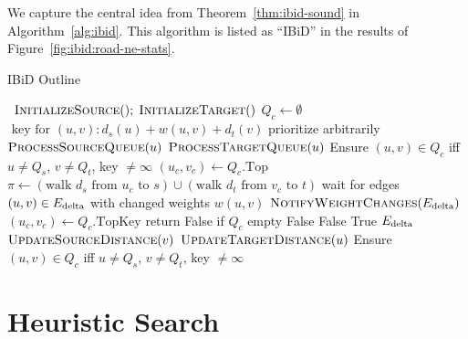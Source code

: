 We capture the central idea from Theorem~\ref{thm:ibid-sound}
in Algorithm~\ref{alg:ibid}.
This algorithm is listed as ``IBiD''
in the results of Figure~\ref{fig:ibid:road-ne-stats}.

\begin{algorithm}[t]
   \caption{IBiD Outline}
   \label{alg:ibid}
   \begin{algorithmic}[1]
       {\,}
         \State $\mbox{\sc InitializeSource}(); \; \mbox{\sc InitializeTarget}()$
         \State $Q_c \gets \emptyset$
            \Comment $\mbox{ key for } (u,v): d_s(u) + w(u,v) + d_t(v)$
         \Loop
                     \Comment prioritize arbitrarily
                  \State $\mbox{\sc ProcessSourceQueue}(u)$
               \Else
                  \State $\mbox{\sc ProcessTargetQueue}(u)$
               \EndIf
               \State Ensure $(u,v) \in Q_c$ iff
                  $u \neq Q_s$, $v \neq Q_t$, key $\neq \infty$
            \EndWhile
            \State $(u_c,v_c) \gets Q_c.\mbox{Top}$
            \State $\pi \gets
               ( \mbox{walk } d_s \mbox{ from } u_c \mbox{ to } s )
               \cup
               ( \mbox{walk } d_t \mbox{ from } v_c \mbox{ to } t )$
            \State wait for edges $(u,v) \in E_{\mbox{\scriptsize delta}}$ with changed weights $w(u,v)$
            \State $\mbox{\sc NotifyWeightChanges}(E_{\mbox{\scriptsize delta}})$
         \EndLoop
      \EndProcedure
       {\,}
         \State $(u_c,v_c) \gets Q_c.\mbox{TopKey}$
            \Comment return False if $Q_c$ empty
            \State \Return False
         \EndIf
            \State \Return False
         \EndIf
         \State \Return True
      \EndFunction
       {$E_{\mbox{\scriptsize delta}}$}
            \State $\mbox{\sc UpdateSourceDistance}(v)$
            \State $\mbox{\sc UpdateTargetDistance}(u)$
         \EndFor
         \State Ensure $(u,v) \in Q_c$ iff
            $u \neq Q_s$, $v \neq Q_t$, key $\neq \infty$
      \EndProcedure
   \end{algorithmic}
\end{algorithm}


\section{Heuristic Search}
\label{sec:ibid:heuristic}

